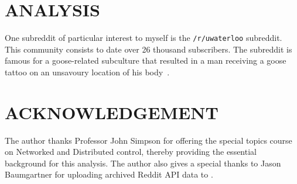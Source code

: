 \documentclass[letterpaper, 10 pt, conference]{ieeeconf}
\theoremstyle{definition}
\begin{document}
\section{ANALYSIS}
One subreddit of particular interest to myself is the \texttt{/r/uwaterloo} subreddit. This community consists to date over 26 thousand subscribers. The subreddit is famous for a goose-related subculture that resulted in a man receiving a goose tattoo on an unsavoury location of his body~\cite{Website:GooseTattoo}.









\section*{ACKNOWLEDGEMENT}
The author thanks Professor John Simpson for offering the special topics course on Networked and Distributed control, thereby providing the essential background for this analysis. The author also gives a special thanks to Jason Baumgartner for uploading archived Reddit API data to \cite{Software:RedditArchive}.


\end{document}
